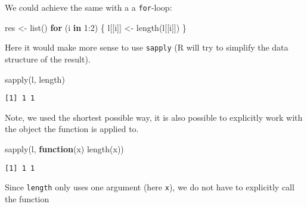\documentclass[ignorenonframetext,,t]{beamer}
\let\oldtextbf\textbf
\renewcommand{\textbf}[1]{\textcolor{spamwell}{\oldtextbf{#1}}}
\newenvironment{Shaded}{\begin{snugshade}}{\end{snugshade}}
\newcommand{\ControlFlowTok}[1]{\textcolor[rgb]{0.13,0.29,0.53}{\textbf{#1}}}
\newcommand{\DecValTok}[1]{\textcolor[rgb]{0.00,0.00,0.81}{#1}}
\newcommand{\FunctionTok}[1]{\textcolor[rgb]{0.00,0.00,0.00}{#1}}
\newcommand{\NormalTok}[1]{#1}
\newcommand{\OtherTok}[1]{\textcolor[rgb]{0.56,0.35,0.01}{#1}}
\newcommand{\SpecialCharTok}[1]{\textcolor[rgb]{0.00,0.00,0.00}{#1}}
\begin{document}
\begin{frame}[fragile]
We could achieve the same with a a \texttt{for}-loop:

\begin{Shaded}
\begin{Highlighting}[]
\NormalTok{res }\OtherTok{\textless{}{-}} \FunctionTok{list}\NormalTok{()}
\ControlFlowTok{for}\NormalTok{ (i }\ControlFlowTok{in} \DecValTok{1}\SpecialCharTok{:}\DecValTok{2}\NormalTok{) \{}
\NormalTok{  l[[i]] }\OtherTok{\textless{}{-}} \FunctionTok{length}\NormalTok{(l[[i]])}
\NormalTok{\}}
\end{Highlighting}
\end{Shaded}
\end{frame}

\begin{frame}[fragile]
Here it would make more sense to use \texttt{sapply} (R will try to
simplify the data structure of the result).

\begin{Shaded}
\begin{Highlighting}[]
\FunctionTok{sapply}\NormalTok{(l, length)}
\end{Highlighting}
\end{Shaded}

\begin{verbatim}
[1] 1 1
\end{verbatim}
\end{frame}

\begin{frame}[fragile]
Note, we used the shortest possible way, it is also possible to
explicitly work with the object the function is applied to.

\begin{Shaded}
\begin{Highlighting}[]
\FunctionTok{sapply}\NormalTok{(l, }\ControlFlowTok{function}\NormalTok{(x) }\FunctionTok{length}\NormalTok{(x))}
\end{Highlighting}
\end{Shaded}

\begin{verbatim}
[1] 1 1
\end{verbatim}

Since \texttt{length} only uses one argument (here \texttt{x}), we do
not have to explicitly call the function
\end{frame}
\end{document}
